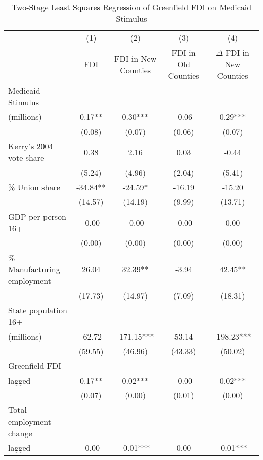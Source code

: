 \begin{table}[!htbp]\centering
\def\sym#1{\ifmmode^{#1}\else\(^{#1}\)\fi}
\caption{Two-Stage Least Squares Regression of Greenfield FDI on Medicaid Stimulus}
\begin{tabular}{l*{4}{c}}
\hline\hline
                    &\multicolumn{1}{c}{(1)}   &\multicolumn{1}{c}{(2)}   &\multicolumn{1}{c}{(3)}   &\multicolumn{1}{c}{(4)}   \\
                    &         FDI   &FDI in New Counties   &FDI in Old Counties   &$\Delta$ FDI in New Counties   \\
\hline
Medicaid Stimulus \\ (millions)&        0.17** &        0.30***&       -0.06   &        0.29***\\
                    &      (0.08)   &      (0.07)   &      (0.06)   &      (0.07)   \\
Kerry's 2004 vote share&        0.38   &        2.16   &        0.03   &       -0.44   \\
                    &      (5.24)   &      (4.96)   &      (2.04)   &      (5.41)   \\
\% Union share      &      -34.84** &      -24.59*  &      -16.19   &      -15.20   \\
                    &     (14.57)   &     (14.19)   &      (9.99)   &     (13.71)   \\
GDP per person 16+  &       -0.00   &       -0.00   &       -0.00   &        0.00   \\
                    &      (0.00)   &      (0.00)   &      (0.00)   &      (0.00)   \\
\% Manufacturing employment&       26.04   &       32.39** &       -3.94   &       42.45** \\
                    &     (17.73)   &     (14.97)   &      (7.09)   &     (18.31)   \\
 State population 16+ \\ (millions)&      -62.72   &     -171.15***&       53.14   &     -198.23***\\
                    &     (59.55)   &     (46.96)   &     (43.33)   &     (50.02)   \\
Greenfield FDI \\ lagged&        0.17** &        0.02***&       -0.00   &        0.02***\\
                    &      (0.07)   &      (0.00)   &      (0.01)   &      (0.00)   \\
Total employment change \\ lagged&       -0.00   &       -0.01***&        0.00   &       -0.01***\\

\end{tabular}
\end{table}
